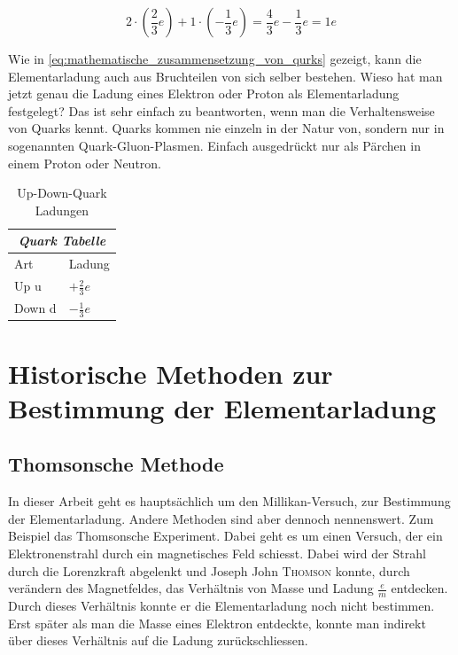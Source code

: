 \begin{equation}\label{eq:mathematische_zusammensetzung_von_qurks}
	2 \cdot \left(\frac{2}{3}e\right)  + 1 \cdot \left( -\frac{1}{3}e\right) 
	= \frac{4}{3}e - \frac{1}{3}e = 1e
\end{equation}

\noindent Wie in \autoref{eq:mathematische_zusammensetzung_von_qurks} gezeigt, kann die Elementarladung auch aus Bruchteilen von sich selber bestehen. Wieso hat man jetzt genau die Ladung eines Elektron oder Proton als Elementarladung festgelegt? Das ist sehr einfach zu beantworten, wenn man die Verhaltensweise von Quarks kennt. Quarks kommen nie einzeln in der Natur von, sondern nur in sogenannten Quark-Gluon-Plasmen. Einfach ausgedrückt nur als Pärchen in einem Proton oder Neutron.


\begin{table}[ht]
	\begin{center}
		\begin{tabular}{l|l}
			\multicolumn{2}{c}{\textit{\textbf{Quark Tabelle}}} \\
			\hline
			Art & Ladung \\
			\hline
			Up u & $+ \frac{2}{3}e$ \\
			\hline
			Down d & $- \frac{1}{3}e$\\
			\hline
		\end{tabular}
	\end{center}
	\caption{Up-Down-Quark Ladungen}
	\label{tab:quark_tabelle}
\end{table}

\section[Historische Methoden]{Historische Methoden zur Bestimmung der Elementarladung}
\subsection{Thomsonsche Methode}\label{sub:thomson}
In dieser Arbeit geht es hauptsächlich um den Millikan-Versuch, zur Bestimmung der Elementarladung. Andere Methoden sind aber dennoch nennenswert. Zum Beispiel das Thomsonsche Experiment. Dabei geht es um einen Versuch, der ein Elektronenstrahl durch ein magnetisches Feld schiesst. Dabei wird der Strahl durch die Lorenzkraft abgelenkt und Joseph John {\scshape Thomson} konnte, durch verändern des Magnetfeldes, das Verhältnis von Masse und Ladung $\frac{e}{m}$ entdecken. Durch dieses Verhältnis konnte er die Elementarladung noch nicht bestimmen. Erst später als man die Masse eines Elektron entdeckte, konnte man indirekt über dieses Verhältnis auf die Ladung zurückschliessen. 

